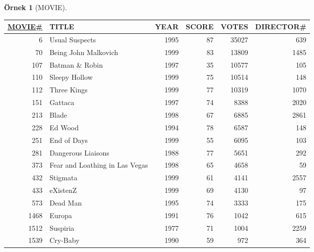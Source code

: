 \documentclass[dvipsnames]{beamer}
\theoremstyle{definition}
\theoremstyle{example}
\newtheorem{ornek}[theorem]{Örnek}
\theoremstyle{plain}
\begin{document}
\begin{frame}
  \begin{ornek}[MOVIE]
    \begin{tiny}
    \begin{table}
      \begin{tabular}{|r|l|r|r|r|r|}\hline
\underline{MOVIE\#} & TITLE           & YEAR & SCORE & VOTES & DIRECTOR\#\\[2pt]\hline\hline
   6 & Usual Suspects                 & 1995 &    87 & 35027 &        639\\\hline
  70 & Being John Malkovich           & 1999 &    83 & 13809 &       1485\\\hline
 107 & Batman \& Robin                & 1997 &    35 & 10577 &        105\\\hline
 110 & Sleepy Hollow                  & 1999 &    75 & 10514 &        148\\\hline
 112 & Three Kings                    & 1999 &    77 & 10319 &       1070\\\hline
 151 & Gattaca                        & 1997 &    74 &  8388 &       2020\\\hline
 213 & Blade                          & 1998 &    67 &  6885 &       2861\\\hline
 228 & Ed Wood                        & 1994 &    78 &  6587 &        148\\\hline
 251 & End of Days                    & 1999 &    55 &  6095 &        103\\\hline
 281 & Dangerous Liaisons             & 1988 &    77 &  5651 &        292\\\hline
 373 & Fear and Loathing in Las Vegas & 1998 &    65 &  4658 &         59\\\hline
 432 & Stigmata                       & 1999 &    61 &  4141 &       2557\\\hline
 433 & eXistenZ                       & 1999 &    69 &  4130 &         97\\\hline
 573 & Dead Man                       & 1995 &    74 &  3333 &        175\\\hline
1468 & Europa                         & 1991 &    76 &  1042 &        615\\\hline
1512 & Suspiria                       & 1977 &    71 &  1004 &       2259\\\hline
1539 & Cry-Baby                       & 1990 &    59 &   972 &        364\\\hline
    \end{tabular}
  \end{table}
  \end{tiny}
  \end{ornek}
\end{frame}
\end{document}
